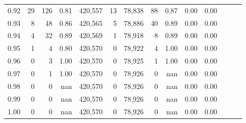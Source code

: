 \begin{tabular}{rrrrrrrrrrrrrr}
0.92 &     29 &    126 &  0.81 &  420,557 &       13 &  78,838 &      88 &  0.87 &  0.00 &      0.00 \\
0.93 &      8 &     48 &  0.86 &  420,565 &        5 &  78,886 &      40 &  0.89 &  0.00 &      0.00 \\
0.94 &      4 &     32 &  0.89 &  420,569 &        1 &  78,918 &       8 &  0.89 &  0.00 &      0.00 \\
0.95 &      1 &      4 &  0.80 &  420,570 &        0 &  78,922 &       4 &  1.00 &  0.00 &      0.00 \\
0.96 &      0 &      3 &  1.00 &  420,570 &        0 &  78,925 &       1 &  1.00 &  0.00 &      0.00 \\
0.97 &      0 &      1 &  1.00 &  420,570 &        0 &  78,926 &       0 &   nan &  0.00 &      0.00 \\
0.98 &      0 &      0 &   nan &  420,570 &        0 &  78,926 &       0 &   nan &  0.00 &      0.00 \\
0.99 &      0 &      0 &   nan &  420,570 &        0 &  78,926 &       0 &   nan &  0.00 &      0.00 \\
1.00 &      0 &      0 &   nan &  420,570 &        0 &  78,926 &       0 &   nan &  0.00 &      0.00 \\
\bottomrule
\end{tabular}
